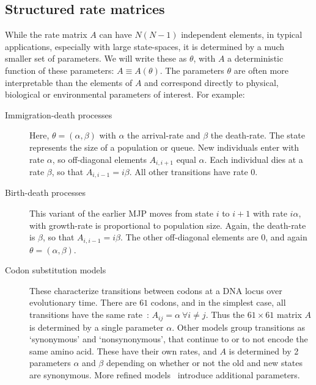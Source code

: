 \subsection{Structured rate matrices}
While the rate matrix $A$ can have $N(N-1)$ independent elements, in typical applications, especially with large state-spaces, it is determined by a much smaller set of parameters. 
We will write these as $\theta$, with $A$ a deterministic function of these parameters: $A \equiv A(\theta)$. 
The parameters $\theta$ are often more interpretable than the elements of $A$ and correspond directly to physical, biological or environmental parameters of interest. 
For example:
\begin{description}
  \item[Immigration-death processes] 
    Here, $\theta = (\alpha,\beta)$ with $\alpha$ the arrival-rate and $\beta$ the death-rate. 
    The state represents the size of a population or queue. 
    New individuals enter with rate $\alpha$, so off-diagonal elements $A_{i,i+1}$ equal $\alpha$.
    Each individual dies at a rate $\beta$, so that $A_{i,i-1}=i\beta$.
    All other transitions have rate $0$. 
  \item[Birth-death processes] 
    This variant of the earlier MJP moves from state $i$ to $i+1$ with rate $i\alpha$, with growth-rate is proportional to population size. 
    Again, the death-rate is $\beta$, so that $A_{i,i-1}=i\beta$.
    The other off-diagonal elements are $0$, and again $\theta=(\alpha,\beta)$.
  \item[Codon substitution models] 
    These characterize transitions between codons at a DNA locus over evolutionary time. 
    There are $61$ codons, and in the simplest case, all transitions have the same rate~\citep{jukescantor69}: $A_{ij} = \alpha\ \forall i \neq j$. 
    Thus the $61\times 61$ matrix $A$ is determined by a single parameter $\alpha$. Other models group transitions as `synonymous' and `nonsynonymous', that continue to or to not encode the same amino acid. 
    These have their own rates, and $A$ is determined by 2 parameters $\alpha$ and $\beta$ depending on whether or not the old and new states are synonymous. 
    More refined models~\citep{goldman1994codon} introduce additional parameters. 
\end{description}
